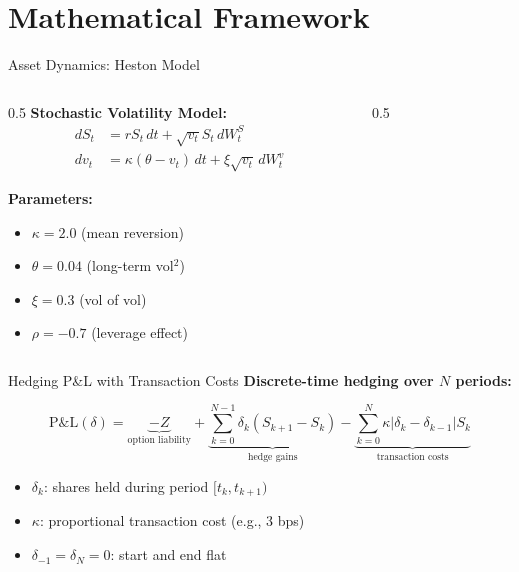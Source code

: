 \documentclass[aspectratio=169,11pt]{beamer}
\begin{document}
\section{Mathematical Framework}

\begin{frame}{Asset Dynamics: Heston Model}
\begin{columns}
\begin{column}{0.5\textwidth}
\textbf{Stochastic Volatility Model:}
\begin{align*}
    dS_t &= r S_t \, dt + \sqrt{v_t} S_t \, dW_t^S \\
    dv_t &= \kappa(\theta - v_t) \, dt + \xi \sqrt{v_t} \, dW_t^v
\end{align*}

\vspace{0.3cm}
\textbf{Parameters:}
\begin{itemize}
    \item $\kappa = 2.0$ (mean reversion)
    \item $\theta = 0.04$ (long-term vol$^2$)
    \item $\xi = 0.3$ (vol of vol)
    \item $\rho = -0.7$ (leverage effect)
\end{itemize}
\end{column}
\begin{column}{0.5\textwidth}
\end{column}
\end{columns}
\end{frame}

\begin{frame}{Hedging P\&L with Transaction Costs}
\textbf{Discrete-time hedging over $N$ periods:}

\begin{equation*}
\boxed{
\text{P\&L}(\delta) = \underbrace{-Z}_{\text{option liability}} + \underbrace{\sum_{k=0}^{N-1} \delta_k (S_{k+1} - S_k)}_{\text{hedge gains}} - \underbrace{\sum_{k=0}^{N} \kappa |\delta_k - \delta_{k-1}| S_k}_{\text{transaction costs}}
}
\end{equation*}

\vspace{0.5cm}
\begin{itemize}
    \item $\delta_k$: shares held during period $[t_k, t_{k+1})$
    \item $\kappa$: proportional transaction cost (e.g., 3 bps)
    \item $\delta_{-1} = \delta_N = 0$: start and end flat
\end{itemize}
\end{frame}
\end{document}
